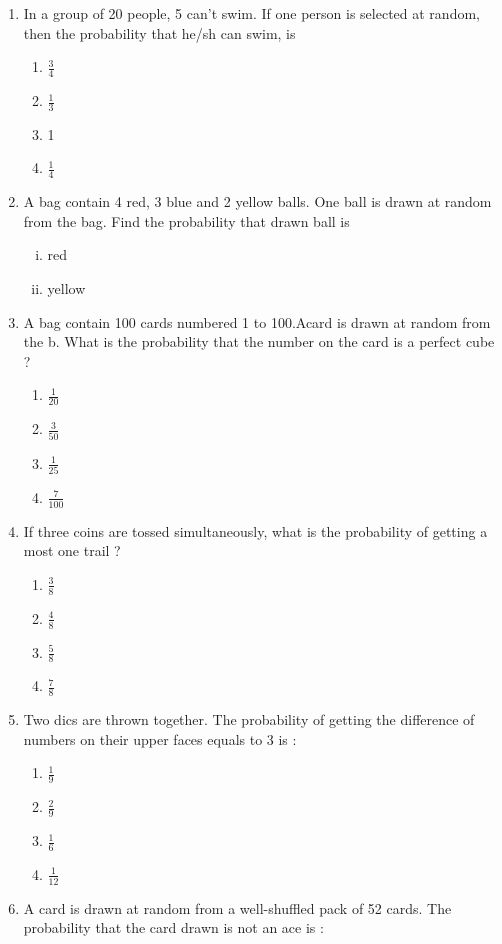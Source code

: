 \begin{enumerate}
\begin{enumerate}
			\end{enumerate}
  	\item In a group of 20 people, 5 can't swim. If one person is selected at random, then the probability that he/sh can swim, is
			\begin{enumerate}
				\item $ \frac {3} {4} $
				\item $ \frac {1} {3} $
				\item 1
				\item $ \frac {1} {4} $ 
			\end{enumerate}
	\item A bag contain 4 red, 3 blue and 2 yellow balls. One ball is drawn at random from the bag. Find the probability that drawn ball is
		\begin{enumerate}[(i)]
					\item red
					\item yellow
		\end{enumerate}
	\item A bag contain 100 cards numbered 1 to 100.Acard is drawn at random from the b. What is the probability that the number on the card is a perfect cube ?
			\begin{enumerate}
				\item $ \frac {1} {20} $
				\item $ \frac {3} {50} $
				\item $ \frac {1} {25} $
				\item $ \frac {7} {100} $
			\end{enumerate}
	\item If three coins are tossed simultaneously, what is the probability of getting a most one trail ?
			\begin{enumerate}
 				\item $ \frac {3} {8} $
				\item $ \frac {4} {8} $
				\item $ \frac {5} {8} $
				\item $ \frac {7} {8} $
			\end{enumerate}
	\item Two dics are thrown together. The probability of getting the difference of numbers on their upper faces equals to 3 is :
			\begin{enumerate}
				\item $ \frac {1} {9} $
				\item $ \frac {2} {9} $
				\item $ \frac {1} {6} $
				\item $ \frac {1} {12} $
			\end{enumerate}
	\item A card is drawn at random from a well-shuffled pack of 52 cards. The probability that the card drawn is not an ace is : 


\end{enumerate}
